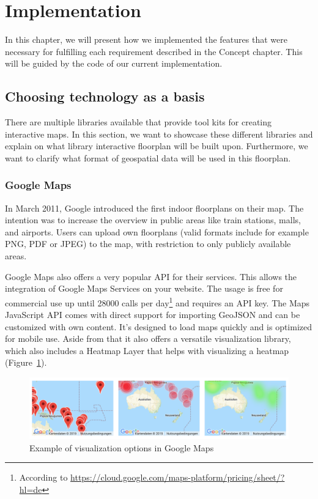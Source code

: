 \section{Implementation}
In this chapter, we will present how we implemented the features that were necessary for fulfilling each requirement described in the Concept chapter. This will be guided by the code of our current implementation.

\subsection{Choosing technology as a basis}

There are multiple libraries available that provide tool kits for creating interactive maps. In this section, we want to showcase these different libraries and explain on what library interactive floorplan will be built upon. Furthermore, we want to clarify what format of geospatial data will be used in this floorplan.

\subsubsection{Google Maps}
\label{Google Maps}

In March 2011, Google introduced the first indoor floorplans on their map. The intention was to increase the overview in public areas like train stations, malls, and airports.
Users can upload own floorplans (valid formats include for example PNG, PDF or JPEG) to the map, with restriction to only publicly available areas.

Google Maps also offers a very popular API for their services. This allows the integration of Google Maps Services on your website. The usage is free for commercial use up until 28000 calls per day\footnote{According to \url{https://cloud.google.com/maps-platform/pricing/sheet/?hl=de}} and requires an API key.
The Maps JavaScript API comes with direct support for importing GeoJSON and can be customized with own content. It's designed to load maps quickly and is optimized for mobile use. Aside from that it also offers a versatile visualization library, which also includes a Heatmap Layer that helps with visualizing a heatmap (Figure~\ref{fig:GoogleMapsHeatmap}).

\begin{figure}[!hb]
    \centering
    \includegraphics[width=1\linewidth]{images/GoogleMapsHeatmap}
    \caption{Example of visualization options in Google Maps}
    \label{fig:GoogleMapsHeatmap}
\end{figure}

